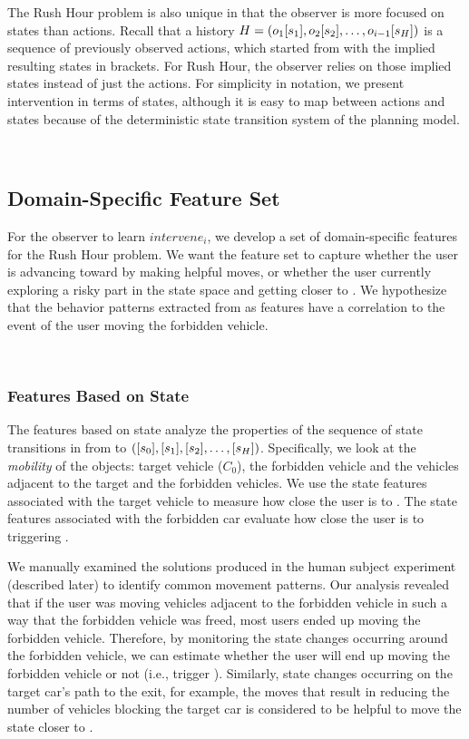 The Rush Hour problem is also unique in that the observer is more focused on states than actions.
Recall that a history  $H = ( o_1 [s_1], o_2 [s_2], \ldots, o_{i-1} [s_{H}])$  is a sequence of previously observed actions, which started from \initialState with the implied resulting states in brackets.
For Rush Hour, the observer relies on those implied states instead of just the actions.
For simplicity in notation, we present intervention in terms of states, although it is easy to map between actions and states because of the deterministic state transition system of the planning model.



~\subsection{Domain-Specific Feature Set}
For the observer to learn $intervene_i$, we develop a set of domain-specific features for the Rush Hour problem.
We want the feature set to capture whether the user is advancing toward \desired by making helpful moves, or whether the user currently exploring a risky part in the state space and getting closer to \undesired.
We hypothesize that the behavior patterns extracted from \historyDef as features have a correlation to the event of the user moving the forbidden vehicle. 

~\subsubsection{Features Based on State}
The features based on state analyze the properties of the sequence of state transitions in \historyDef from \initialState to \historyEndState $( [s_0], [s_1], [s_2], \ldots, [s_{H}])$.
Specifically, we look at the \textit{mobility} of the objects: target vehicle ($C_0$), the forbidden vehicle and the vehicles adjacent to the target and the forbidden vehicles.
We use the state features associated with the target vehicle to measure how close the user is to \desired. 
The state features associated with the forbidden car evaluate how close the user is to triggering \undesired. 

We manually examined the solutions produced in the human subject experiment (described later) to identify common movement patterns. 
Our analysis revealed that if the user was moving vehicles adjacent to the forbidden vehicle in such a way that the forbidden vehicle was freed, most users ended up moving the forbidden vehicle. 
Therefore, by monitoring the state changes occurring around the forbidden vehicle, we can estimate whether the user will end up moving the forbidden vehicle or not (i.e., trigger \undesired). 
Similarly, state changes occurring on the target car’s path to the exit, for example, the moves that result in reducing the number of vehicles blocking the target car is considered to be helpful to move the state closer to \desired.

